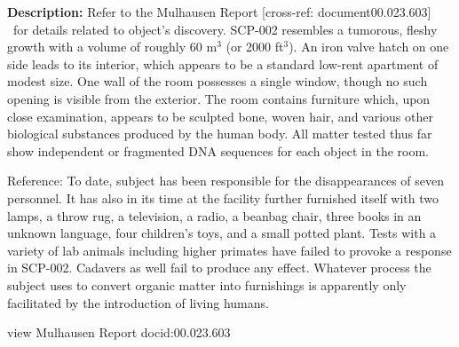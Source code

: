\textbf{Description:} Refer to the Mulhausen Report [cross-ref: document00\linebreak.023.603] \ for details related to object's discovery. SCP-002 resembles a tumorous, fleshy growth with a volume of roughly 60 m$^3$ (or 2000 ft$^3$). An iron valve hatch on one side leads to its interior, which appears to be a standard low-rent apartment of modest size. One wall of the room possesses a single window, though no such opening is visible from the exterior. The room contains furniture which, upon close examination, appears to be sculpted bone, woven hair, and various other biological substances produced by the human body. All matter tested thus far show independent or fragmented DNA sequences for each object in the room.

Reference: To date, subject has been responsible for the disappearances of seven personnel. It has also in its time at the facility further furnished itself with two lamps, a throw rug, a television, a radio, a beanbag chair, three books in an unknown language, four children's toys, and a small potted plant. Tests with a variety of lab animals including higher primates have failed to provoke a response in SCP-002. Cadavers as well fail to produce any effect. Whatever process the subject uses to convert organic matter into furnishings is apparently only facilitated by the introduction of living humans.

\begin{leftbar}
view Mulhausen Report docid:00.023.603
\end{leftbar}

